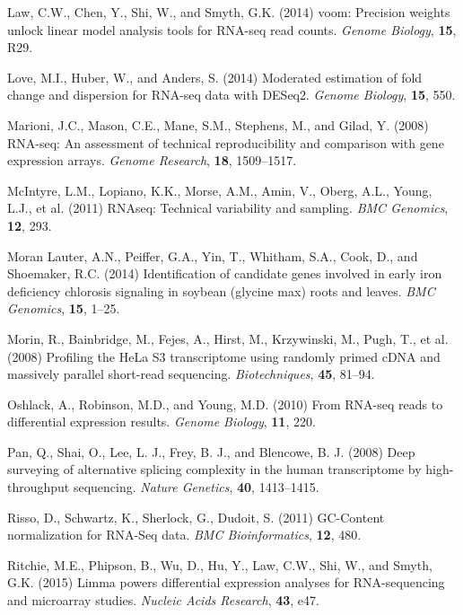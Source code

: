 \documentclass{bioinfo}
\begin{document}
\begin{thebibliography}{}
Law, C.W., Chen, Y., Shi, W., and Smyth, G.K. (2014) voom: Precision weights unlock linear model analysis tools for RNA-seq read counts. {\it Genome Biology}, {\bf 15}, R29.

Love, M.I., Huber, W., and Anders, S. (2014) Moderated estimation of fold change and dispersion for RNA-seq data with DESeq2. {\it Genome Biology}, {\bf 15}, 550.

Marioni, J.C., Mason, C.E., Mane, S.M., Stephens, M., and Gilad, Y. (2008) RNA-seq: An assessment of technical reproducibility and comparison with gene expression arrays. {\it Genome Research}, {\bf 18}, 1509--1517.

McIntyre, L.M., Lopiano, K.K., Morse, A.M., Amin, V., Oberg, A.L., Young, L.J., et al. (2011) RNAseq: Technical variability and sampling. {\it BMC Genomics}, {\bf 12}, 293.

Moran Lauter, A.N., Peiffer, G.A., Yin, T., Whitham, S.A., Cook, D., and Shoemaker, R.C. (2014) Identification of candidate genes involved in early iron deficiency chlorosis signaling in soybean (glycine max) roots and leaves. {\it BMC Genomics}, {\bf 15}, 1--25.

Morin, R., Bainbridge, M., Fejes, A., Hirst, M., Krzywinski, M., Pugh, T., et al. (2008) Profiling the HeLa S3 transcriptome using randomly primed cDNA and massively parallel short-read sequencing. {\it Biotechniques}, {\bf 45}, 81--94.

Oshlack, A., Robinson, M.D., and Young, M.D. (2010) From RNA-seq reads to differential expression results.
{\it Genome Biology}, {\bf 11}, 220.

Pan, Q., Shai, O., Lee, L. J., Frey, B. J., and Blencowe, B. J. (2008) Deep surveying of alternative splicing complexity in the human transcriptome by high-throughput sequencing. {\it Nature Genetics}, {\bf 40}, 1413--1415.

Risso, D., Schwartz, K., Sherlock, G., Dudoit, S. (2011) GC-Content normalization for RNA-Seq data. {\it BMC Bioinformatics}, {\bf 12}, 480.

Ritchie, M.E., Phipson, B., Wu, D., Hu, Y., Law, C.W., Shi, W., and Smyth, G.K. (2015) Limma powers differential expression analyses for RNA-sequencing and microarray studies. {\it Nucleic Acids Research}, {\bf 43}, e47.


\end{thebibliography}
\end{document}
